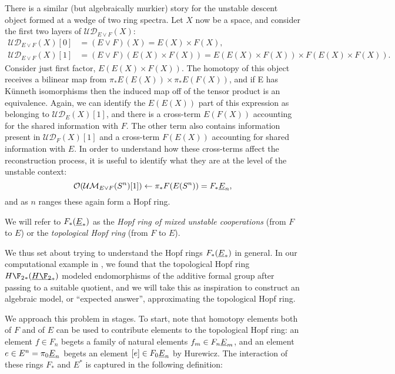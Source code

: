 There is a similar (but algebraically murkier) story for the unstable descent object formed at a wedge of two ring spectra.  Let $X$ now be a space, and consider the first two layers of $\mathcal{UD}_{E \vee F}(X)$:
\begin{align*}
\mathcal{UD}_{E \vee F}(X)[0] & = (E \vee F)(X) = E(X) \times F(X), \\
\mathcal{UD}_{E \vee F}(X)[1] & = (E \vee F)(E(X) \times F(X)) = E(E(X) \times F(X)) \times F(E(X) \times F(X)).
\end{align*}
Consider just first factor, $E(E(X) \times F(X))$.  The homotopy of this object receives a bilinear map from $\pi_* E(E(X)) \times \pi_* E(F(X))$, and if E has K\"unneth isomorphisms then the induced map off of the tensor product is an equivalence.  Again, we can identify the $E(E(X))$ part of this expression as belonging to $\mathcal{UD}_E(X)[1]$, and there is a cross-term $E(F(X))$ accounting for the shared information with $F$.  The other term also contains information present in $\mathcal{UD}_F(X)[1]$ and a cross-term $F(E(X))$ accounting for shared information with $E$.  In order to understand how these cross-terms affect the reconstruction process, it is useful to identify what they are at the level of the unstable context: \[\mathcal{O}(\mathcal{UM}_{E \vee F}(S^n)[1]) \leftarrow \pi_* F(E(S^n)) = F_* \underline{\smash{E}}_{n},\] and as $n$ ranges these again form a Hopf ring.

\begin{definition}
We will refer to $F_*(\underline{\smash{E}}_{*})$ as the \textit{Hopf ring of mixed unstable cooperations} (from $F$ to $E$) or the \textit{topological Hopf ring} (from $F$ to $E$).
\end{definition}

We thus set about trying to understand the Hopf rings $F_*(\underline{\smash{E}}_{*})$ in general.  In our computational example in , we found that the topological Hopf ring $H\F_2{}_*(\OS{H\F_2}{*})$ modeled endomorphisms of the additive formal group after passing to a suitable quotient, and we will take this as inspiration to construct an algebraic model, or ``expected answer'', approximating the topological Hopf ring.

We approach this problem in stages.  To start, note that homotopy elements both of $F$ and of $E$ can be used to contribute elements to the topological Hopf ring: an element $f \in F_n$ begets a family of natural elements $f_m \in F_n \underline{\smash{E}}_{m}$, and an element $e \in E^n = \pi_0 \underline{\smash{E}}_{n}$ begets an element $[e] \in F_0 \underline{\smash{E}}_{n}$ by Hurewicz.  The interaction of these rings $F_*$ and $E^*$ is captured in the following definition:

